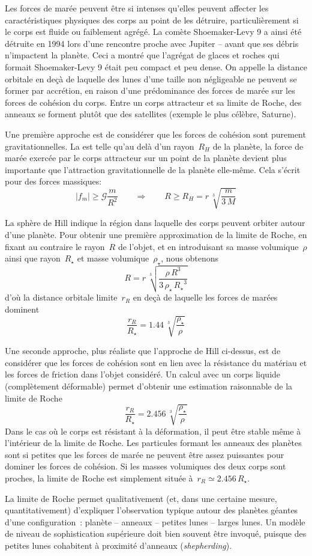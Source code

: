 \sk
Les forces de marée peuvent être si intenses qu'elles peuvent affecter les caractéristiques physiques des corps au point de les détruire, particulièrement si le corps est fluide ou faiblement agrégé. La comète Shoemaker-Levy 9 a ainsi été détruite en 1994 lors d'une rencontre proche avec Jupiter -- avant que ses débris n'impactent la planète. Ceci a montré que l'agrégat de glaces et roches qui formait Shoemaker-Levy 9 était peu compact et peu dense. On appelle  la distance orbitale en deçà de laquelle des lunes d'une taille non négligeable ne peuvent se former par accrétion, en raison d'une prédominance des forces de marée sur les forces de cohésion du corps. Entre un corps attracteur et sa limite de Roche, des anneaux se forment plutôt que des satellites (exemple le plus célèbre, Saturne).

\sk
Une première approche est de considérer que les forces de cohésion sont purement gravitationnelles. La  est telle qu'au delà d'un rayon~$R_H$ de la planète, la force de marée exercée par le corps attracteur sur un point de la planète devient plus importante que l'attraction gravitationnelle de la planète elle-même. Cela s'écrit pour des forces massiques:
\[ |f_m| \geq \mathcal{G} \frac{m}{R^2} \qquad \Rightarrow \qquad R \geq R_H = r \, \sqrt[3]{ \frac{m}{3\,M} } \]

\sk
La sphère de Hill indique la région dans laquelle des corps peuvent orbiter autour d'une planète. Pour obtenir une première approximation de la limite de Roche, en fixant au contraire le rayon~$R$ de l'objet, et en introduisant sa masse volumique~$\rho$ ainsi que rayon~$R_{\star}$ et masse volumique~$\rho_{\star}$, nous obtenons
\[ R = r \, \sqrt[3]{ \frac{\rho \, R^3}{3\, \rho_{\star} \, {R_{\star}}^3} } \]
d'où la distance orbitale limite~$r_R$ en deçà de laquelle les forces de marées dominent
\[ \frac{r_R}{R_{\star}} = 1.44 \, \sqrt[3]{ \frac{\rho_{\star}}{\rho} } \]

\sk
Une seconde approche, plus réaliste que l'approche de Hill ci-dessus, est de considérer que les forces de cohésion sont en lien avec la résistance du matériau et les forces de friction dans l'objet considéré. Un calcul avec un corps liquide (complètement déformable) permet d'obtenir une estimation raisonnable de la limite de Roche
\[ \frac{r_R}{R_{\star}} = 2.456 \, \sqrt[3]{ \frac{\rho_{\star}}{\rho} } \]
\noindent Dans le cas où le corps est résistant à la déformation, il peut être stable même à l'intérieur de la limite de Roche. Les particules formant les anneaux des planètes sont si petites que les forces de marée ne peuvent être assez puissantes pour dominer les forces de cohésion. Si les masses volumiques des deux corps sont proches, la limite de Roche est simplement située à~$r_R \simeq 2.456 \, R_{\star}$.

\sk
La limite de Roche permet qualitativement (et, dans une certaine mesure, quantitativement) d'expliquer l'observation typique autour des planètes géantes d'une configuration~: planète -- anneaux -- petites lunes -- larges lunes. Un modèle de niveau de sophistication supérieure doit bien souvent être invoqué, puisque des petites lunes cohabitent à proximité d'anneaux (\emph{shepherding}).

